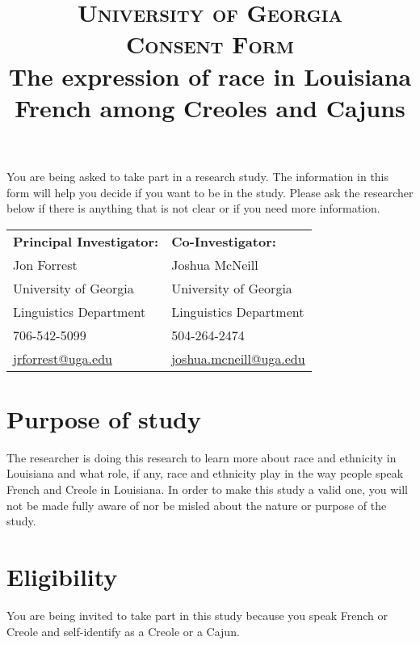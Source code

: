 \documentclass{article}
\title{\textsc{
           University of Georgia \\
           Consent Form \\
         }
         The expression of race in Louisiana French among Creoles and Cajuns}
\date{}
\newcommand{\tabhead}[1]{\textbf{#1}}
\begin{document}
    \maketitle
    You are being asked to take part in a research study.
    The information in this form will help you decide if you want to be in the study.
    Please ask the researcher below if there is anything that is not clear or if you need more information.
    \begin{center}
      \begin{tabular}{l l}
        \tabhead{Principal Investigator:}                  & \tabhead{Co-Investigator:} \\
        Jon Forrest                                        & Joshua McNeill \\
        University of Georgia                              & University of Georgia \\
        Linguistics Department                             & Linguistics Department \\
        706-542-5099                                       & 504-264-2474 \\
        \href{mailto:jrforrest@uga.edu}{jrforrest@uga.edu} & \href{mailto:joshua.mcneill@uga.edu}{joshua.mcneill@uga.edu}
      \end{tabular}
    \end{center}

    \section{Purpose of study}
      The researcher is doing this research to learn more about race and ethnicity in Louisiana and what role, if any, race and ethnicity play in the way people speak French and Creole in Louisiana.
      In order to make this study a valid one, you will not be made fully aware of nor be misled about the nature or purpose of the study.

    \section{Eligibility}
      You are being invited to take part in this study because you speak French or Creole and self-identify as a Creole or a Cajun.
\end{document}
